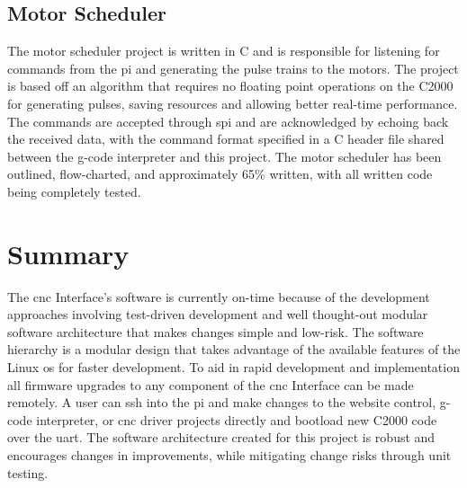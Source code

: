 \subsection{Motor Scheduler}
The motor scheduler project is written in C and is responsible for listening for commands from the \gls{pi} and generating the pulse trains to the motors.
The project is based off an algorithm that requires no floating point operations on the C2000 for generating pulses, saving resources and allowing better real-time performance.
The commands are accepted through \gls{spi} and are acknowledged by echoing back the received data, with the command format specified in a C header file shared between the g-code interpreter and this project.
The motor scheduler has been outlined, flow-charted, and approximately 65\% written, with all written code being completely tested.

\section{Summary}
The \gls{cnc} Interface's software is currently on-time because of the development approaches involving test-driven development and well thought-out modular software architecture that makes changes simple and low-risk.
The software hierarchy is a modular design that takes advantage of the available features of the Linux \gls{os} for faster development.
To aid in rapid development and implementation all firmware upgrades to any component of the \gls{cnc} Interface can be made remotely.
A user can \gls{ssh} into the \gls{pi} and make changes to the website control, g-code interpreter, or \gls{cnc} driver projects directly and bootload new C2000 code over the \gls{uart}.
The software architecture created for this project is robust and encourages changes in improvements, while mitigating change risks through unit testing.
